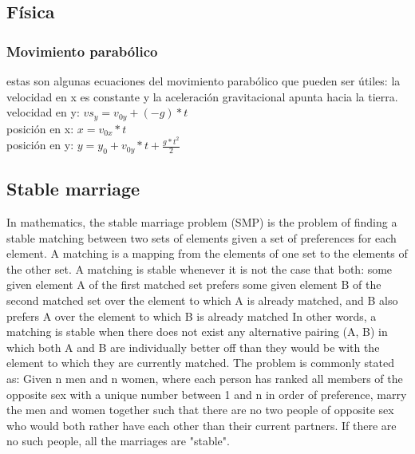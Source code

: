 \documentclass[10pt,letterpaper,twocolumn,twosided]{article}
\begin{document}
\subsection{Física}

\subsubsection{Movimiento parabólico} 
estas son algunas ecuaciones del movimiento parabólico que pueden ser útiles:
la velocidad en x es constante y la aceleración gravitacional apunta hacia la tierra.\\

velocidad en y: $ vs_{y} = v_{0y} +(-g)*t   $\\ 
posición en x:  $ x = v_{0x}*t   $\\
posición en y:  $ y = y_{0} + v_{0y}*t + \frac{g*t^2}{2} $ \\

\subsection{Stable marriage}

In mathematics, the stable marriage problem (SMP) is the problem of finding a stable matching between two sets of elements given a set of preferences for each element. A matching is a mapping from the elements of one set to the elements of the other set. A matching is stable whenever it is not the case that both:
some given element A of the first matched set prefers some given element B of the second matched set over the element to which A is already matched, and
B also prefers A over the element to which B is already matched
In other words, a matching is stable when there does not exist any alternative pairing (A, B) in which both A and B are individually better off than they would be with the element to which they are currently matched.
The problem is commonly stated as:
Given n men and n women, where each person has ranked all members of the opposite sex with a unique number between 1 and n in order of preference, marry the men and women together such that there are no two people of opposite sex who would both rather have each other than their current partners. If there are no such people, all the marriages are "stable".
\end{document}
